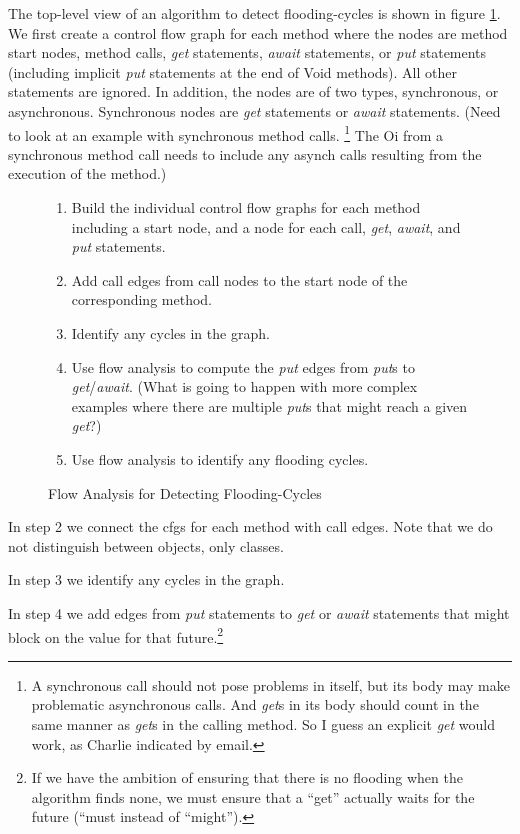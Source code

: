 \documentclass[12pt]{article}%
\begin{document}
The top-level view of an algorithm to detect flooding-cycles is shown in figure \ref{flow-analysis}.
We first create a control flow graph for each method where the nodes are method start nodes, method calls, \emph{get} statements, 
\emph{await} statements,
or \emph{put} statements (including implicit \emph{put} statements at the end of Void methods).
All other statements are ignored. 
In addition, the nodes are of two types,
synchronous, or asynchronous. Synchronous nodes are \emph{get} statements or \emph{await} statements.
(Need to look at an example with synchronous method calls.
\footnote{
A synchronous call should not pose problems in itself, but its body may make 
problematic asynchronous calls. And \emph{get}s in its body should count in the same manner as \emph{get}s in the calling method. So I guess an explicit \emph{get} would work, as Charlie indicated by email.}
The Oi from a synchronous method call needs to include any asynch calls
resulting from the execution of the method.)

\begin{figure}
\begin{shaded}
\begin{enumerate}
\item Build the individual control flow graphs for each method including a start node, and a node for each call, \emph{get}, \emph{await}, and \emph{put} statements.
\item Add call edges from call nodes to the start node of the corresponding method.
\item Identify any cycles in the graph.
\item Use flow analysis to compute the \emph{put} edges from \emph{put}s to \emph{get}/\emph{await}. (What is going to happen with more complex examples
where there are multiple \emph{put}s that might reach a given \emph{get}?)
\item Use flow analysis to identify any flooding cycles.
\end{enumerate}\end{shaded}%
\caption{\label{flow-analysis}
Flow Analysis for Detecting Flooding-Cycles}
\end{figure}

In step 2 we connect the cfgs for each method with call edges. Note that we do not distinguish between objects, only classes.

In step 3 we identify any cycles in the graph.

In step 4 we add edges from \emph{put} statements to \emph{get} or \emph{await} statements that might block on the value for that future.\footnote{If we have the ambition of ensuring that 
there is no flooding when the algorithm finds none,
we must ensure that a ``get'' actually waits for the future
(``must instead of ``might'').}
\end{document}
